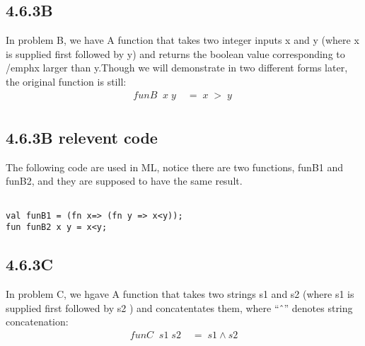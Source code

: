 \documentclass{report}
\begin{document}
\subsection{4.6.3B}
\label{sec:4.6.3b}
In problem B, we have A function that takes two integer inputs x and y
(where x is supplied first followed by y) and returns the boolean
value corresponding to /emph{x larger than y}.Though we will demonstrate in two different forms later, the original function is still:
\begin{align*}
  funB\;\; x\;y \;&= \;x\;>\;y\;\\
\end{align*}

\subsection{4.6.3B relevent code}
\label{sec:4.6.3b-relevent-code}

The following code are used in ML, notice there are two functions, funB1 and funB2, and they are supposed to have the same result.
\lstset{frameround=tttt}
\begin{lstlisting}[frame=tRBL]

val funB1 = (fn x=> (fn y => x<y));
fun funB2 x y = x<y;
\end{lstlisting}

\subsection{4.6.3C}
\label{sec:4.6.3c}
In problem C, we hgave A function that takes two strings s1 and s2 (where s1 is supplied first followed by s2 ) and concatentates
them, where “ˆ” denotes string concatenation:
\begin{align*}
  funC\;\; s1\;s2\;&=\;s1\wedge s2\\
\end{align*}

\end{document}
